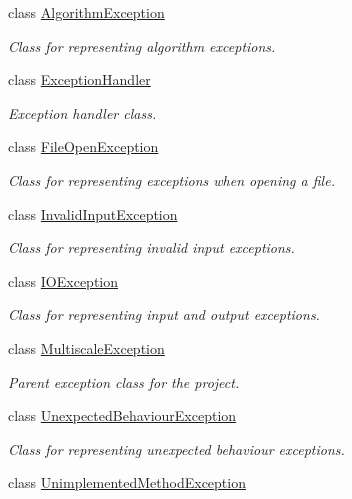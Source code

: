 \begin{DoxyCompactItemize}
\item 
class \hyperlink{classmultiscale_1_1AlgorithmException}{Algorithm\-Exception}
\begin{DoxyCompactList}\small\item\em Class for representing algorithm exceptions. \end{DoxyCompactList}\item 
class \hyperlink{classmultiscale_1_1ExceptionHandler}{Exception\-Handler}
\begin{DoxyCompactList}\small\item\em Exception handler class. \end{DoxyCompactList}\item 
class \hyperlink{classmultiscale_1_1FileOpenException}{File\-Open\-Exception}
\begin{DoxyCompactList}\small\item\em Class for representing exceptions when opening a file. \end{DoxyCompactList}\item 
class \hyperlink{classmultiscale_1_1InvalidInputException}{Invalid\-Input\-Exception}
\begin{DoxyCompactList}\small\item\em Class for representing invalid input exceptions. \end{DoxyCompactList}\item 
class \hyperlink{classmultiscale_1_1IOException}{I\-O\-Exception}
\begin{DoxyCompactList}\small\item\em Class for representing input and output exceptions. \end{DoxyCompactList}\item 
class \hyperlink{classmultiscale_1_1MultiscaleException}{Multiscale\-Exception}
\begin{DoxyCompactList}\small\item\em Parent exception class for the project. \end{DoxyCompactList}\item 
class \hyperlink{classmultiscale_1_1UnexpectedBehaviourException}{Unexpected\-Behaviour\-Exception}
\begin{DoxyCompactList}\small\item\em Class for representing unexpected behaviour exceptions. \end{DoxyCompactList}\item 
class \hyperlink{classmultiscale_1_1UnimplementedMethodException}{Unimplemented\-Method\-Exception}

\end{DoxyCompactItemize}
